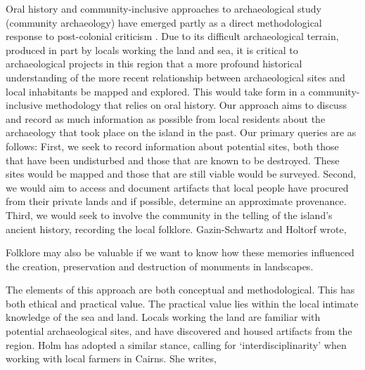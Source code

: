 Oral history and community-inclusive approaches to archaeological study (community archaeology) have emerged partly as a direct methodological response to post-colonial criticism \parencites{Smith_2005}{Hill_2011}{McNiven_2005}{Lyons_2013}{Lavin_2013}. Due to its difficult archaeological terrain, produced in part by locals working the land and sea, it is critical to archaeological projects in this region that a more profound historical understanding of the more recent relationship between archaeological sites and local inhabitants be mapped and explored. This would take form in a community-inclusive methodology that relies on oral history. Our approach aims to discuss and record as much information as possible from local residents about the archaeology that took place on the island in the past. Our primary queries are as follows: First, we seek to record information about potential sites, both those that have been undisturbed and those that are known to be destroyed. These sites would be mapped and those that are still viable would be surveyed. Second, we would aim to access and document artifacts that local people have procured from their private lands and if possible, determine an approximate provenance. Third, we would seek to involve the community in the telling of the island’s ancient history, recording the local folklore. Gazin-Schwartz and Holtorf wrote,

\begin{aquote}{\cite[15]{Gazin-Schwartz_1999}}
Folklore may also be valuable if we want to know how these memories influenced the creation, preservation and destruction of monuments in landscapes.
\end{aquote}
The elements of this approach are both conceptual and methodological. 
This has both ethical and practical value. The practical value lies within the local intimate knowledge of the sea and land. Locals working the land are familiar with potential archaeological sites, and have discovered and housed artifacts from the region. Holm has adopted a similar stance, calling for ‘interdisciplinarity’ when working with local farmers in Cairns. She writes,
	
